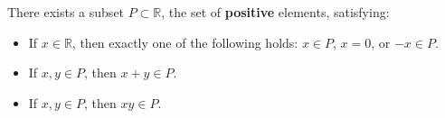 There exists a subset $P \subset \mathbb{R}$, the set of \textbf{positive} elements, satisfying:

\begin{itemize}
\item[O1.] If $x \in \mathbb{R}$, then exactly one of the following holds: $x \in P$, $x = 0$, or $-x \in P$.
\item[O2.] If $x, y \in P$, then $x + y \in P$.
\item[O3.] If $x, y \in P$, then $xy \in P$.
\end{itemize}
